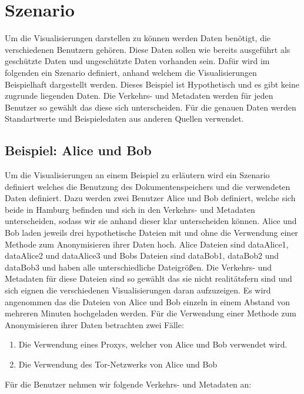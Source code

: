 \documentclass[
    fontsize=12pt,
    headings=small,
    parskip=half,           %
    bibliography=totoc,
    numbers=noenddot,       %
    open=any,               %
    ]{scrreprt}
\begin{document}
\chapter{Szenario} \label{Kap:Szenarios}

Um die Visualisierungen darstellen zu können werden Daten benötigt, die verschiedenen Benutzern gehören.
Diese Daten sollen wie bereits ausgeführt als geschützte Daten und ungeschützte Daten vorhanden sein. 
Dafür wird im folgenden ein Szenario definiert, anhand welchem die Visualisierungen Beispielhaft dargestellt werden. 
Dieses Beispiel ist Hypothetisch und es gibt keine zugrunde liegenden Daten. 
Die Verkehrs- und Metadaten werden für jeden Benutzer so gewählt das diese sich unterscheiden. 
Für die genauen Daten werden Standartwerte und Beispieledaten aus anderen Quellen verwendet. 

    \section{Beispiel: Alice und Bob}
Um die Visualisierungen an einem Beispiel zu erläutern wird ein Szenario definiert welches die Benutzung des Dokumentenspeichers und die verwendeten Daten definiert.
Dazu werden zwei Benutzer Alice und Bob definiert, welche sich beide in Hamburg befinden und sich in den Verkehrs- und Metadaten unterscheiden, sodass wir sie anhand dieser klar unterscheiden können.
Alice und Bob laden jeweils drei hypothetische Dateien mit und ohne die Verwendung einer Methode zum Anonymisieren ihrer Daten hoch.
Alice Dateien sind dataAlice1, dataAlice2 und dataAlice3 und Bobs Dateien sind dataBob1, dataBob2 und dataBob3 und haben alle unterschiedliche Dateigrößen.
Die Verkehrs- und Metadaten für diese Dateien sind so gewählt das sie nicht realitätsfern sind und sich eignen die verschiedenen Visualisierungen daran aufzuzeigen. 
Es wird angenommen das die Dateien von Alice und Bob einzeln in einem Abstand von mehreren Minuten hochgeladen werden.
Für die Verwendung einer Methode zum Anonymisieren ihrer Daten betrachten zwei Fälle:
\begin{enumerate}
\item Die Verwendung eines Proxys, welcher von Alice und Bob verwendet wird.
\item Die Verwendung des Tor-Netzwerks von Alice und Bob
\end{enumerate}

Für die Benutzer nehmen wir folgende Verkehrs- und Metadaten an: 
\end{document}
